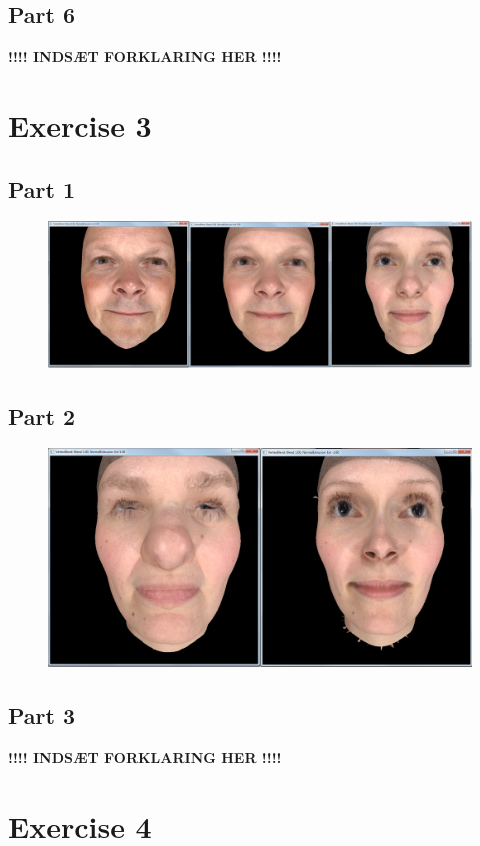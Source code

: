\documentclass[11pt]{article}
\begin{document}
\subsection{Part 6}
\textbf{!!!! INDSÆT FORKLARING HER !!!!}



\section{Exercise 3}
\subsection{Part 1}
\begin{figure}[H]
	\centering
	\includegraphics[width=0.5\linewidth]{images/e03p1}
	\label{fig:e03p1}
\end{figure}


\subsection{Part 2}
\begin{figure}[H]
	\centering
	\includegraphics[width=0.5\linewidth]{images/e03p2}
	\label{fig:e03p2}
\end{figure}


\subsection{Part 3}
\textbf{!!!! INDSÆT FORKLARING HER !!!!}


\section{Exercise 4}
\end{document}
